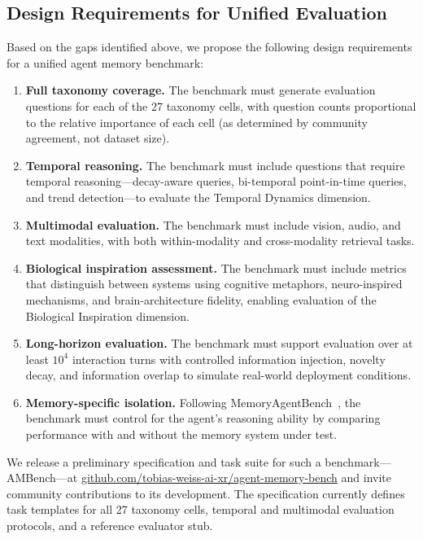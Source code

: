 \subsection{Design Requirements for Unified Evaluation}

Based on the gaps identified above, we propose the following design requirements for a unified agent memory benchmark:

\begin{enumerate}
	\item \textbf{Full taxonomy coverage.} The benchmark must generate evaluation questions for each of the 27 taxonomy cells, with question counts proportional to the relative importance of each cell (as determined by community agreement, not dataset size).
	\item \textbf{Temporal reasoning.} The benchmark must include questions that require temporal reasoning---decay-aware queries, bi-temporal point-in-time queries, and trend detection---to evaluate the Temporal Dynamics dimension.
	\item \textbf{Multimodal evaluation.} The benchmark must include vision, audio, and text modalities, with both within-modality and cross-modality retrieval tasks.
	\item \textbf{Biological inspiration assessment.} The benchmark must include metrics that distinguish between systems using cognitive metaphors, neuro-inspired mechanisms, and brain-architecture fidelity, enabling evaluation of the Biological Inspiration dimension.
	\item \textbf{Long-horizon evaluation.} The benchmark must support evaluation over at least $10^4$ interaction turns with controlled information injection, novelty decay, and information overlap to simulate real-world deployment conditions.
	\item \textbf{Memory-specific isolation.} Following MemoryAgentBench~\cite{Unknown2025MemoryAgentBench}, the benchmark must control for the agent's reasoning ability by comparing performance with and without the memory system under test.
\end{enumerate}

We release a preliminary specification and task suite for such a benchmark---AMBench---at \url{github.com/tobias-weiss-ai-xr/agent-memory-bench} and invite community contributions to its development. The specification currently defines task templates for all 27 taxonomy cells, temporal and multimodal evaluation protocols, and a reference evaluator stub.
